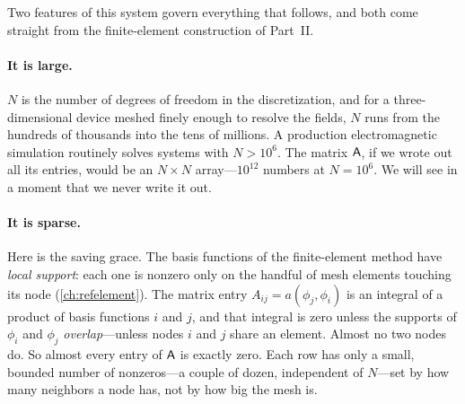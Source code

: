 Two features of this system govern everything that follows, and both come straight
from the finite-element construction of Part~II.

\paragraph{It is large.} $N$ is the number of degrees of freedom in the
discretization, and for a three-dimensional device meshed finely enough to
resolve the fields, $N$ runs from the hundreds of thousands into the tens of
millions. A production electromagnetic simulation routinely solves systems with
$N>10^6$. The matrix $\mathsf{A}$, if we wrote out all its entries, would be an
$N\times N$ array---$10^{12}$ numbers at $N=10^6$. We will see in a moment that we
never write it out.

\paragraph{It is sparse.} Here is the saving grace. The basis functions of the
finite-element method have \emph{local support}: each one is nonzero only on the
handful of mesh elements touching its node (\cref{ch:refelement}). The matrix entry
$A_{ij}=a(\phi_j,\phi_i)$ is an integral of a product of basis functions $i$ and
$j$, and that integral is zero unless the supports of $\phi_i$ and $\phi_j$
\emph{overlap}---unless nodes $i$ and $j$ share an element. Almost no two nodes do.
So almost every entry of $\mathsf{A}$ is exactly zero. Each row has only a small,
bounded number of nonzeros---a couple of dozen, independent of $N$---set by how
many neighbors a node has, not by how big the mesh is.

